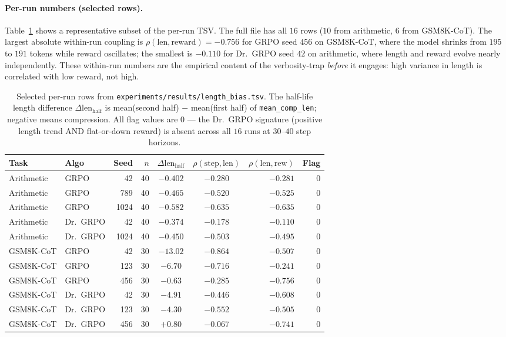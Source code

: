 \paragraph{Per-run numbers (selected rows).}
Table~\ref{tab:length-bias-per-run} shows a representative subset
of the per-run TSV. The full file has all $16$ rows
($10$ from arithmetic, $6$ from GSM8K-CoT). The largest absolute
within-run coupling is $\rho(\text{len},\text{reward})=-0.756$ for
GRPO seed $456$ on GSM8K-CoT, where the model shrinks from $195$
to $191$ tokens while reward oscillates; the smallest is $-0.110$
for Dr.~GRPO seed $42$ on arithmetic, where length and reward
evolve nearly independently. These within-run numbers are the
empirical content of the verbosity-trap \emph{before} it engages:
high variance in length is correlated with low reward, not high.

\begin{table}[htbp]
\centering
\small
\begin{tabular}{llrrccrr}
\toprule
Task & Algo & Seed & $n$ & $\Delta\text{len}_\text{half}$
   & $\rho(\text{step},\text{len})$ & $\rho(\text{len},\text{rew})$
   & Flag \\
\midrule
Arithmetic   & GRPO     & 42    & 40 & $-0.402$ & $-0.280$  & $-0.281$ & 0 \\
Arithmetic   & GRPO     & 789   & 40 & $-0.465$ & $-0.520$  & $-0.525$ & 0 \\
Arithmetic   & GRPO     & 1024  & 40 & $-0.582$ & $-0.635$  & $-0.635$ & 0 \\
Arithmetic   & Dr.~GRPO & 42    & 40 & $-0.374$ & $-0.178$  & $-0.110$ & 0 \\
Arithmetic   & Dr.~GRPO & 1024  & 40 & $-0.450$ & $-0.503$  & $-0.495$ & 0 \\
GSM8K-CoT    & GRPO     & 42    & 30 & $-13.02$ & $-0.864$  & $-0.507$ & 0 \\
GSM8K-CoT    & GRPO     & 123   & 30 & $-6.70$  & $-0.716$  & $-0.241$ & 0 \\
GSM8K-CoT    & GRPO     & 456   & 30 & $-0.63$  & $-0.285$  & $-0.756$ & 0 \\
GSM8K-CoT    & Dr.~GRPO & 42    & 30 & $-4.91$  & $-0.446$  & $-0.608$ & 0 \\
GSM8K-CoT    & Dr.~GRPO & 123   & 30 & $-4.30$  & $-0.552$  & $-0.505$ & 0 \\
GSM8K-CoT    & Dr.~GRPO & 456   & 30 & $+0.80$  & $-0.067$  & $-0.741$ & 0 \\
\bottomrule
\end{tabular}
\caption{Selected per-run rows from \texttt{experiments/results/length\_bias.tsv}. The
half-life length difference $\Delta\text{len}_\text{half}$ is mean(second half) $-$
mean(first half) of \texttt{mean\_comp\_len}; negative means compression. All flag values
are $0$ --- the Dr.~GRPO signature (positive length trend AND flat-or-down reward) is absent
across all $16$ runs at $30$--$40$ step horizons.}
\label{tab:length-bias-per-run}
\end{table}

